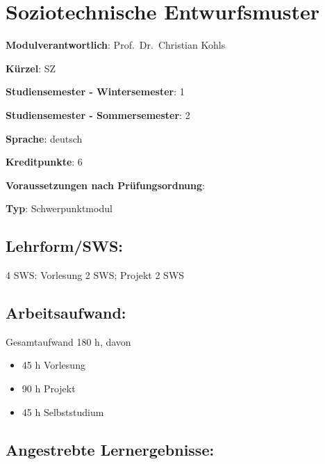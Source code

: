 \chapter{Soziotechnische
Entwurfsmuster}\label{soziotechnische-entwurfsmuster}

\begin{modulHead}
\textbf{Modulverantwortlich}: Prof.~Dr.~Christian
Kohls
\end{modulHead}
\begin{modulHead}
\textbf{Kürzel}:
SZ
\end{modulHead}
\begin{modulHead}
\textbf{Studiensemester -
Wintersemester}:
1
\end{modulHead}
\begin{modulHead}
\textbf{Studiensemester -
Sommersemester}: 2
\end{modulHead}
\begin{modulHead}
\textbf{Sprache}:
deutsch
\end{modulHead}
\begin{modulHead}
\textbf{Kreditpunkte}:
6
\end{modulHead}
\begin{modulHead}
\textbf{Voraussetzungen nach
Prüfungsordnung}: 
\end{modulHead}
\begin{modulHead}
\textbf{Typ}:
Schwerpunktmodul
\end{modulHead}


\section*{Lehrform/SWS:}\label{lehrformsws-13}

4 SWS: Vorlesung 2 SWS; Projekt 2 SWS

\section*{Arbeitsaufwand:}\label{arbeitsaufwand-18}

Gesamtaufwand 180 h, davon

\begin{itemize}
\tightlist
\item
  45 h Vorlesung
\item
  90 h Projekt
\item
  45 h Selbststudium
\end{itemize}

\section*{Angestrebte
Lernergebnisse:}\label{angestrebte-lernergebnisse-12}

